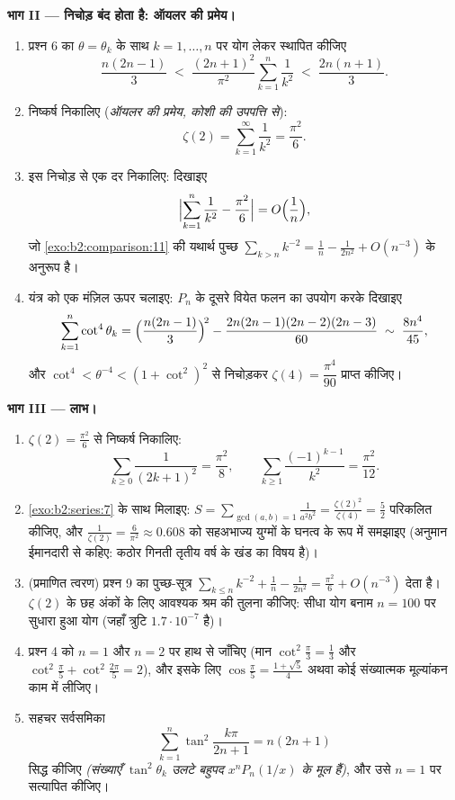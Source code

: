 \begin{problem}[{सप्ताहांत समस्या --- $\zeta(2) = \pi^2/6$ और बर्ट्रांड
परिदृश्य}]
\medskip
\noindent\textbf{भाग II --- निचोड़ बंद होता है: ऑयलर की प्रमेय।}
\begin{enumerate}[resume]
  \item प्रश्न 6 का $\theta =
        \theta_k$ के साथ $k = 1, \dots, n$ पर योग लेकर स्थापित कीजिए
        \[
        \frac{n(2n-1)}{3} \;<\;
        \frac{(2n+1)^2}{\pi^2}\sum_{k=1}^{n}\frac1{k^2}
        \;<\; \frac{2n(n+1)}{3}.
        \]
  \item निष्कर्ष निकालिए (\emph{ऑयलर की प्रमेय, कोशी की उपपत्ति से}):
        \[
        \zeta(2) = \sum_{k=1}^{\infty}\frac{1}{k^2} =
        \frac{\pi^2}{6}.
        \]
  \item इस निचोड़ से एक दर निकालिए: दिखाइए
        \[
        \Bigl|\sum_{k=1}^{n}\frac1{k^2} - \frac{\pi^2}6\Bigr|
        = O\Bigl(\frac1n\Bigr),
        \]
        जो \cref{exo:b2:comparison:11} की यथार्थ पुच्छ $\sum_{k>n}k^{-2} =
        \frac1n - \frac{1}{2n^2} + O(n^{-3})$ के अनुरूप है।
  \item यंत्र को एक मंज़िल ऊपर चलाइए: $P_n$ के दूसरे वियेत फलन का उपयोग
        करके दिखाइए
        \[
        \sum_{k=1}^{n}\cot^4\theta_k =
        \Bigl(\frac{n(2n-1)}3\Bigr)^{\!2} -
        \frac{2n(2n-1)(2n-2)(2n-3)}{60}
        \;\sim\; \frac{8n^4}{45},
        \]
        और $\cot^4 < \theta^{-4} < (1 +
        \cot^2)^2$ से निचोड़कर $\zeta(4) = \dfrac{\pi^4}{90}$ प्राप्त कीजिए।
\end{enumerate}

\medskip
\noindent\textbf{भाग III --- लाभ।}
\begin{enumerate}[resume]
  \item $\zeta(2) = \frac{\pi^2}6$ से निष्कर्ष निकालिए:
        \[
        \sum_{k\geq0}\frac{1}{(2k+1)^2} = \frac{\pi^2}{8},
        \qquad
        \sum_{k\geq1}\frac{(-1)^{k-1}}{k^2} = \frac{\pi^2}{12}.
        \]
  \item \cref{exo:b2:series:7} के साथ मिलाइए: $S =
        \sum_{\gcd(a,b)=1}\frac{1}{a^2b^2} =
        \frac{\zeta(2)^2}{\zeta(4)} = \frac52$ परिकलित कीजिए, और $\frac{1}{\zeta(2)} = \frac{6}{\pi^2} \approx 0.608$ को सहअभाज्य
        युग्मों के घनत्व के रूप में समझाइए (अनुमान ईमानदारी से कहिए:
        कठोर गिनती तृतीय वर्ष के खंड का विषय है)।
  \item (प्रमाणित त्वरण) प्रश्न 9 का पुच्छ-सूत्र $\sum_{k\leq n}k^{-2} + \frac1n - \frac1{2n^2} =
        \frac{\pi^2}6 + O(n^{-3})$ देता है। $\zeta(2)$ के छह
        अंकों के लिए आवश्यक श्रम की तुलना कीजिए: सीधा योग बनाम $n = 100$ पर
        सुधारा हुआ योग (जहाँ त्रुटि $1.7\cdot10^{-7}$ है)।
  \item प्रश्न 4 को $n = 1$ और $n = 2$ पर हाथ से जाँचिए (मान $\cot^2\frac\pi3 = \frac13$ और $\cot^2\frac\pi5 + \cot^2\frac{2\pi}5 = 2$),
        और इसके लिए $\cos\frac\pi5 = \frac{1+\sqrt5}4$ अथवा कोई संख्यात्मक मूल्यांकन काम में लीजिए।
  \item सहचर सर्वसमिका
        \[
        \sum_{k=1}^{n}\tan^2\frac{k\pi}{2n+1} = n(2n+1)
        \]
        सिद्ध कीजिए \emph{(संख्याएँ $\tan^2\theta_k$ उलटे बहुपद $x^nP_n(1/x)$ के मूल हैं)},
        और उसे $n
        = 1$ पर सत्यापित कीजिए।
\end{enumerate}


\end{problem}
